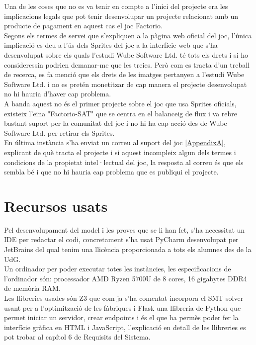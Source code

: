 Una de les coses que no es va tenir en compte a l'inici del projecte era les implicacions legals que pot tenir desenvolupar un projecte relacionat amb un producte de pagament en aquest cas el joc Factorio.\\
Segons els termes de servei que s'expliquen a la pàgina web oficial del joc, l'única implicació es deu a l'ús dels Sprites del joc a la interfície web que s'ha desenvolupat sobre els quals l'estudi Wube Software Ltd. té tots els drets i si ho consideressin podrien demanar-me que les treies. Però com es tracta d'un treball de recerca, es fa menció que els drets de les imatges pertanyen a l'estudi Wube Software Ltd. i no es pretén monetitzar de cap manera el projecte desenvolupat no hi hauria d'haver cap problema.\\
A banda aquest no és el primer projecte sobre el joc que usa Sprites oficials, existeix l'eina "Factorio-SAT" que se centra en el balanceig de flux i va rebre bastant suport per la comunitat del joc i no hi ha cap acció des de Wube Software Ltd. per retirar els Sprites.\\

En última instància s'ha enviat un correu al suport del joc \ref{AppendixA}, explicant de què tracta el projecte i si aquest incompleix algun dels termes i condicions de la propietat intel·lectual del joc, la resposta al correu és que els sembla bé i que no hi hauria cap problema que es publiqui el projecte.

\section{Recursos usats}
Pel desenvolupament del model i les proves que se li han fet, s'ha necessitat un IDE per redactar el codi, concretament s'ha usat PyCharm desenvolupat per JetBrains del qual tenim una llicència proporcionada a tots els alumnes des de la UdG.\\
Un ordinador per poder executar totes les instàncies, les especificacions de l'ordinador són: processador AMD Ryzen 5700U de 8 cores, 16 gigabytes DDR4 de memòria RAM.\\
Les llibreries usades són Z3 que com ja s'ha comentat incorpora el SMT solver usant per a l'optimització de les fàbriques i Flask una llibreria de Python que permet iniciar un servidor, crear endpoints i és el que ha permès poder fer la interfície gràfica en HTML i JavaScript, l'explicació en detall de les llibreries es pot trobar al capítol 6 de Requisits del Sistema.
